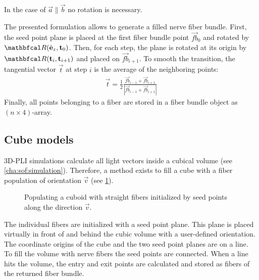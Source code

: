 %
In the case of $\vec{a} \parallel \vec{b}$ no rotation is necessary.
\par
%
The presented formulation allows to generate a filled nerve fiber bundle.
First, the seed point plane is placed at the first fiber bundle point $\vec{fb}_0$ and rotated by $\mat{R}(\hat{\vec{e}}_z, \vec{t}_0)$.
Then, for each step, the plane is rotated at its origin by $\mat{R}(\vec{t}_i, \vec{t}_{i+1})$ and placed on $\vec{fb}_{i+1}$.
To smooth the transition, the tangential vector $\vec{t}$ at step $i$ is the average of the neighboring points:
\begin{align}
    \vec{t} = \frac{1}{2} \frac{\vec{fb}_{i-1} + \vec{fb}_{i+1}}{|\vec{fb}_{i-1} + \vec{fb}_{i+1}|}
\end{align}
%
Finally, all points belonging to a fiber are stored in a fiber bundle object as $(n \times 4)$-array.
%
%
%
\subsection{Cube models} \label{sec:cubeModelBuilding}
%
\tikzset{external/export next=false}
\unskip
%
\ac{3D-PLI} simulations calculate all light vectors inside a cubical volume (see \cref{cha:sof:simulation}).
Therefore, a method exists to fill a cube with a fiber population of orientation $\vec{v}$ (see \cref{fig:cubeBuild}).
%
\begin{figure}[!t]
    \centering
    \setlength{\tikzwidth}{0.5\textwidth}
	\caption[]{Populating a cuboid with straight fibers initialized by seed points along the direction $\vec{v}$.}
    \label{fig:cubeBuild}%
\end{figure}
%
The individual fibers are initialized with a seed point plane.
This plane is placed virtually in front of and behind the cubic volume with a user-defined orientation.
The coordinate origins of the cube and the two seed point planes are on a line.
To fill the volume with nerve fibers the seed points are connected.
When a line hits the volume, the entry and exit points are calculated and stored as fibers of the returned fiber bundle.
%
%
%
